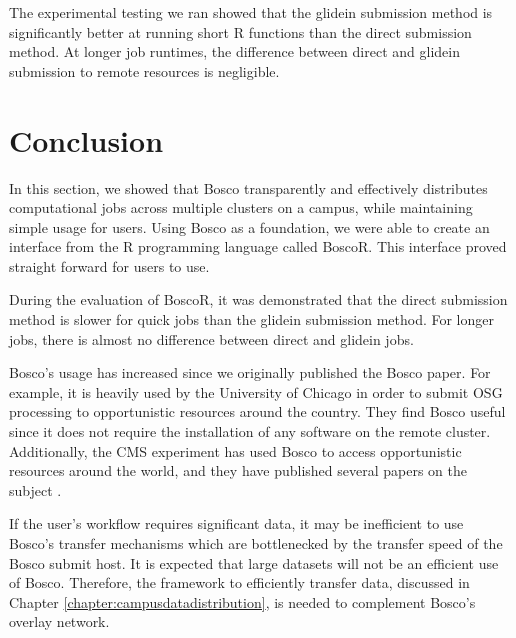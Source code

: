 The experimental testing we ran showed that the glidein submission method is significantly better at running short R functions than the direct submission method.  At longer job runtimes, the difference between direct and glidein submission to remote resources is negligible.






\section{Conclusion}

In this section, we showed that Bosco transparently and effectively distributes computational jobs across multiple clusters on a campus, while maintaining simple usage for users.  Using Bosco as a foundation, we were able to create an interface from the R programming language called BoscoR.  This interface proved straight forward for users to use.  

During the evaluation of BoscoR, it was demonstrated that the direct submission method is slower for quick jobs than the glidein submission method.  For longer jobs, there is almost no difference between direct and glidein jobs.

Bosco's usage has increased since we originally published the Bosco paper.  For example, it is heavily used by the University of Chicago in order to submit OSG processing to opportunistic resources around the country.  They find Bosco useful since it does not require the installation of any software on the remote cluster.  Additionally, the CMS experiment has used Bosco to access opportunistic resources around the world, and they have published several papers on the subject \cite{hufnagelcmsopportunistic, piperovoperationalchep15, wagner2013using, kreuzer2014opportunistic}.

If the user's workflow requires significant data, it may be inefficient to use Bosco's transfer mechanisms which are bottlenecked by the transfer speed of the Bosco submit host.  It is expected that large datasets will not be an efficient use of Bosco.  Therefore, the framework to efficiently transfer data, discussed in Chapter \ref{chapter:campusdatadistribution}, is needed to complement Bosco's overlay network.



